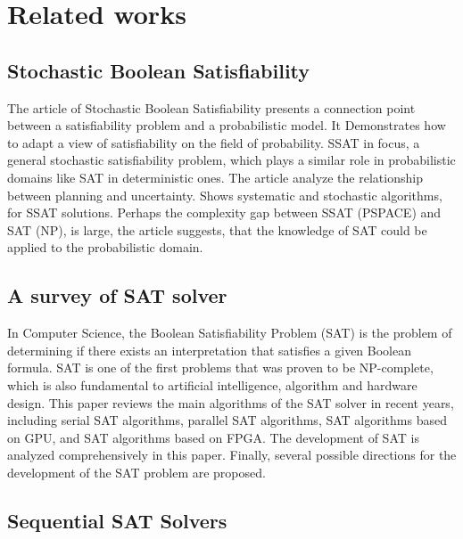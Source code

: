 \documentclass{article}
\begin{document}
\section{Related works}
\label{sec:relwork}

\subsection{Stochastic Boolean Satisfiability \cite{sbs}}

The article of Stochastic Boolean Satisfiability presents a connection point between a satisfiability problem and a probabilistic model. It Demonstrates how to adapt a view of satisfiability on the field of probability. SSAT in focus, a general stochastic satisfiability problem, which plays a similar role in probabilistic domains like SAT in deterministic ones. The article analyze the relationship between planning and uncertainty. Shows systematic and stochastic algorithms, for SSAT solutions. Perhaps the complexity gap between SSAT (PSPACE) and SAT (NP), is large, the article suggests, that the knowledge of SAT could be applied to the probabilistic domain.

\subsection{A survey of SAT solver \cite{surveyOfSatSolvers}}

In Computer Science, the Boolean Satisfiability Problem (SAT) is the problem of determining if there exists an interpretation that satisfies a given Boolean formula. SAT is one of the first problems that was proven to be NP-complete, which is also fundamental to artificial intelligence, algorithm and hardware design. This paper reviews the main algorithms of the SAT solver in recent years, including serial SAT algorithms, parallel SAT algorithms, SAT algorithms based on GPU, and SAT algorithms based on FPGA. The development of SAT is analyzed comprehensively in this paper. Finally, several possible directions for the development of the SAT problem are proposed.

\subsection{Sequential SAT Solvers}
\end{document}

